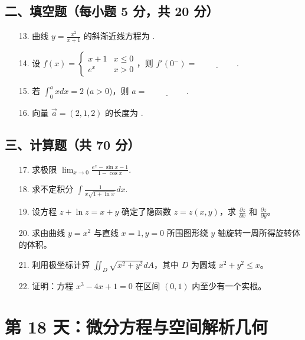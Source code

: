 \documentclass[11pt,a4paper]{article}
\begin{document}
\subsection*{二、填空题（每小题 5 分，共 20 分）}
\begin{enumerate}
    \item[13.] 曲线 $y = \frac{x^2}{x+1}$ 的斜渐近线方程为 \underline{\hspace{2cm}}.
    \item[14.] 设 $f(x) = \begin{cases} x+1 & x \le 0 \\ e^x & x > 0 \end{cases}$，则 $f'(0^-) = \underline{\hspace{2cm}}. $
    \item[15.] 若 $\int_0^a x dx = 2$ ($a>0$)，则 $a = \underline{\hspace{2cm}}$.
    \item[16.] 向量 $\vec{a}=(2,1,2)$ 的长度为 \underline{\hspace{2cm}}.
\end{enumerate}
\subsection*{三、计算题（共 70 分）}
\begin{enumerate}
    \item[17.] 求极限 $\lim_{x \to 0} \frac{e^x - \sin x - 1}{1 - \cos x}$.
    \item[18.] 求不定积分 $\int \frac{1}{x \sqrt{1+\ln x}} dx$.
    \item[19.] 设方程 $z + \ln z = x + y$ 确定了隐函数 $z = z(x,y)$，求 $\frac{\partial z}{\partial x}$ 和 $\frac{\partial z}{\partial y}$。
    \item[20.] 求由曲线 $y=x^2$ 与直线 $x=1, y=0$ 所围图形绕 $y$ 轴旋转一周所得旋转体的体积。
    \item[21.] 利用极坐标计算 $\iint_D \sqrt{x^2+y^2} dA$，其中 $D$ 为圆域 $x^2+y^2 \le x$。
    \item[22.] 证明：方程 $x^3 - 4x + 1 = 0$ 在区间 $(0, 1)$ 内至少有一个实根。
\end{enumerate}

\newpage

\section*{第 18 天：微分方程与空间解析几何}
\end{document}
